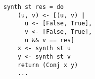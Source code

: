 
\begin{figure}[!t]
  \centering
  \begin{minipage}{0.7\textwidth}
    \begin{lstlisting}[frame=tb] 
  synth st res = do 
    (u, v) <- [(u, v) | 
      u <- [False, True], 
      v <- [False, True], 
      u && v == res]
    x <- synth st u 
    y <- synth st v 
    return (Conj x y) 
    ...
    \end{lstlisting}
  \end{minipage}
\end{figure}
